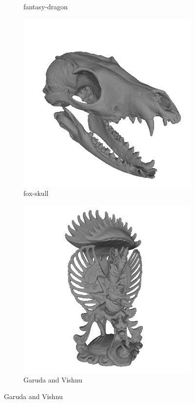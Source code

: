 \begin{figure}
\begin{subfigure}[b]{0.23\linewidth}
		\caption{fantasy-dragon}
	\end{subfigure}
	\begin{subfigure}[b]{0.23\linewidth}
		\includegraphics[width=\linewidth]{./Figures/train-dataset/18.fox-skull.png}
		\caption{fox-skull}
	\end{subfigure}
	\begin{subfigure}[b]{0.23\linewidth}
		\includegraphics[width=\linewidth]{./Figures/train-dataset/19.garuda-and-vishnu.png}
		\caption{Garuda and Vishnu}
	\end{subfigure}
	

\end{figure}
